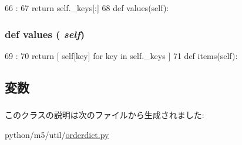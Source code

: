 \begin{DoxyCode}
66                   :
67         return self._keys[:]
68 
    def values(self):
\end{DoxyCode}
\hypertarget{classm5_1_1util_1_1orderdict_1_1orderdict_abb73a0060caeba53780d972f37623f1e}{
\subsubsection[{values}]{\setlength{\rightskip}{0pt plus 5cm}def values ( {\em self})}}
\label{classm5_1_1util_1_1orderdict_1_1orderdict_abb73a0060caeba53780d972f37623f1e}



\begin{DoxyCode}
69                     :
70         return [ self[key] for key in self._keys ]
71 
    def items(self):
\end{DoxyCode}


\subsection{変数}
\hypertarget{classm5_1_1util_1_1orderdict_1_1orderdict_acfb10d1266cc09a17da517a676ee4570}{
\subsubsection[{\_\-keys}]{}}
\label{classm5_1_1util_1_1orderdict_1_1orderdict_acfb10d1266cc09a17da517a676ee4570}


このクラスの説明は次のファイルから生成されました:\begin{DoxyCompactItemize}
\item 
python/m5/util/\hyperlink{orderdict_8py}{orderdict.py}\end{DoxyCompactItemize}
